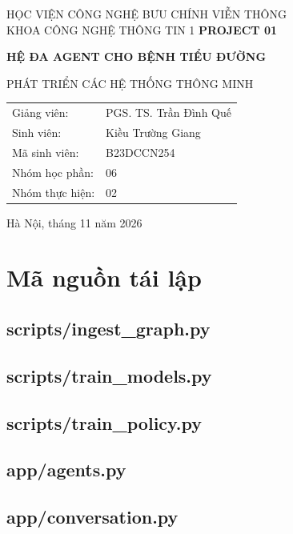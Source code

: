 \documentclass[12pt,a4paper,oneside]{report}
\begin{document}
\begin{titlepage}\centering
{\large HỌC VIỆN CÔNG NGHỆ BƯU CHÍNH VIỄN THÔNG\\KHOA CÔNG NGHỆ THÔNG TIN 1}\vfill
{\LARGE\bfseries PROJECT 01}\par\vspace{1cm}
{\Large\bfseries HỆ ĐA AGENT CHO BỆNH TIỂU ĐƯỜNG}\par\vspace{1cm}
{\large PHÁT TRIỂN CÁC HỆ THỐNG THÔNG MINH}\vfill
\begin{tabular}{ll}Giảng viên:&PGS. TS. Trần Đình Quế\\Sinh viên:&Kiều Trường Giang\\Mã sinh viên:&B23DCCN254\\Nhóm học phần:&06\\Nhóm thực hiện:&02\end{tabular}\vfill
Hà Nội, tháng 11 năm 2026\end{titlepage}\tableofcontents\clearpage\listoffigures\clearpage\listoftables\clearpage{}
\setcounter{secnumdepth}{2}\appendix\chapter{Mã nguồn tái lập}
\section{scripts/ingest\_graph.py}
\section{scripts/train\_models.py}
\section{scripts/train\_policy.py}
\section{app/agents.py}
\section{app/conversation.py}
\end{document}
